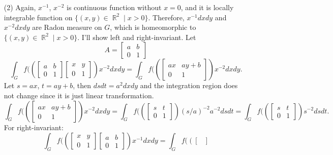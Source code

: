 \documentclass{article}
\DeclareMathOperator{\rr}{\mathbb{R}}
\begin{document}
\begin{enumerate}
\item[(2)]Again, $x^{-1}$, $x^{-2}$ is continuous function without $x=0$, and it is locally integrable function on $\{(x,y)\in\rr^2\mid x>0\}$. Therefore, $x^{-1}dxdy$ and $x^{-2}dxdy$ are Radon measure on $G$, which is homeomorphic to $\{(x,y)\in\rr^2\mid x>0\}$. I'll show left and right-invariant. Let
\begin{equation*}
A=\begin{bmatrix}
a & b \\
0 & 1
\end{bmatrix}
\end{equation*}
\begin{equation*}
\int_G f(\left(\begin{bmatrix}
a & b \\
0 & 1
\end{bmatrix}\begin{bmatrix}
x & y \\
0 & 1
\end{bmatrix}\right)x^{-2}dxdy=\int_G f(\left(\begin{bmatrix}
ax & ay+b \\
0 & 1
\end{bmatrix}\right)x^{-2}dxdy.
\end{equation*}
Let $s=ax$, $t=ay+b$, then $dsdt=a^2dxdy$ and the integration region does not change since it is just linear transformation.
\begin{equation*}
\int_G f(\left(\begin{bmatrix}
ax & ay+b \\
0 & 1
\end{bmatrix}\right)x^{-2}dxdy=\int_G f(\left(\begin{bmatrix}
s & t \\
0 & 1
\end{bmatrix}\right)(s/a)^{-2}a^{-2}dsdt=\int_G f(\left(\begin{bmatrix}
s & t \\
0 & 1
\end{bmatrix}\right)s^{-2}dsdt.
\end{equation*}
For right-invariant:
\begin{equation*}
\int_G f(\left(\begin{bmatrix}
x & y \\
0 & 1
\end{bmatrix}\begin{bmatrix}
a & b \\
0 & 1
\end{bmatrix}\right)x^{-1}dxdy=\int_G f(\left(\begin{bmatrix}

\end{bmatrix}
\end{equation*}
\end{enumerate}
\end{document}

